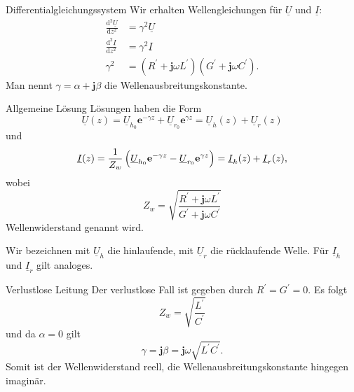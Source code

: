 \documentclass{beamer}
\begin{document}
\begin{frame}{Differentialgleichungssystem}
Wir erhalten Wellengleichungen für $\underline{U}$ und $\underline{I}$:
\begin{align}
    \frac{\text{d}^{2} \underline{U}}{\text{d} z^{2}} &= \gamma^{2} \underline{U} \label{eq:VerlustDgl1} \\[1ex]
    \frac{\text{d}^{2} \underline{I}}{\text{d} z^{2}} &= \gamma^{2} \underline{I} \label{eq:VerlustDgl2} \\[1ex]
    \gamma^{2} &= \left( R^{\prime} + \mathbf{j} \omega L^{\prime} \right) \left( G^{\prime}
    + \mathbf{j} \omega C^{\prime} \right) \label{eq:Gamma}.
\end{align}
Man nennt $\gamma = \alpha + \mathbf{j} \beta$ die Wellenausbreitungskonstante.

\end{frame}


\begin{frame}{Allgemeine Lösung}
    Lösungen haben die Form
    \begin{equation}
        \underline{U}(z) = \underline{U}_{h_{0}} \mathbf{e}^{- \gamma z}
        +
        \underline{U}_{r_{0}} \mathbf{e}^{\gamma z}
        = \underline{U}_{h}(z) + \underline{U}_{r}(z) \label{eq:VerlustU}
    \end{equation}
    und
    \begin{equation}
        \underline{I}(z) = \frac{1}{Z_{w}} \left( \vphantom{\sqrt{1}{Z}}
        \underline{U}_{h_{0}} \mathbf{e}^{- \gamma z} - \underline{U}_{r_{0}} \mathbf{e}^{\gamma z} \right)
        = \underline{I}_{h}(z) + \underline{I}_{r}(z), \label{eq:VerlustI}
    \end{equation}
    wobei
    \begin{equation}
        Z_{w} = \sqrt{\frac{R^{\prime} + \mathbf{j} \omega L^{\prime}}{G^{\prime} + \mathbf{j} \omega C^{\prime}}}
        \label{eq:Zw}
    \end{equation}
    Wellenwiderstand genannt wird.


    Wir bezeichnen mit $\underline{U}_{h}$ die \alert{hinlaufende}, mit $\underline{U}_{r}$ die
    \alert{rücklaufende} Welle. Für $\underline{I}_{h}$ und $\underline{I}_{r}$ gilt analoges.

\end{frame}


\begin{frame}{Verlustlose Leitung}
Der verlustlose Fall ist gegeben durch \mbox{$R^{\prime} = G^{\prime} = 0$}.
Es folgt
\[
Z_{w} = \sqrt{\frac{L^{\prime}}{C^{\prime}}}
\]
und da $\alpha = 0$ gilt
\[
\gamma = \mathbf{j} \beta = \mathbf{j} \omega \sqrt{L^{\prime} C^{\prime}}.
\]
Somit ist der Wellenwiderstand \alert{reell}, die Wellenausbreitungskonstante hingegen
\alert{imaginär}.
\end{frame}
\end{document}
